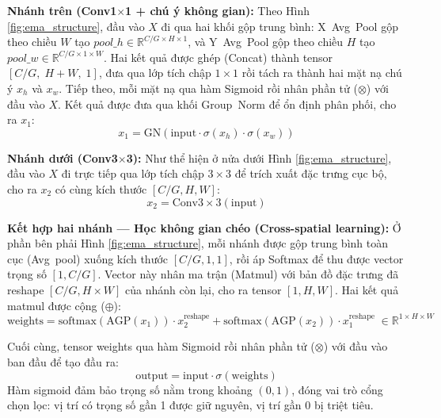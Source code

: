 \documentclass{uetgraduation}
\begin{document}
\textbf{Nhánh trên (Conv1$\times$1 + chú ý không gian):} Theo Hình
\ref{fig:ema_structure}, đầu vào $X$ đi qua hai khối gộp trung bình: X~Avg~Pool
gộp theo chiều $W$ tạo $pool\_h \in \mathbb{R}^{C/G \times H \times 1}$, và
Y~Avg~Pool gộp theo chiều $H$ tạo $pool\_w \in \mathbb{R}^{C/G \times 1 \times W}$.
Hai kết quả được ghép (Concat) thành tensor $[C/G,\; H+W,\; 1]$, đưa qua lớp tích
chập $1\times1$ rồi tách ra thành hai mặt nạ chú ý $x_h$ và $x_w$. Tiếp theo,
mỗi mặt nạ qua hàm Sigmoid rồi nhân phần tử ($\otimes$) với đầu vào $X$. Kết quả
được đưa qua khối Group~Norm để ổn định phân phối, cho ra $x_1$:
\begin{equation}
    x_1 = \text{GN}\!\left(\text{input} \cdot \sigma(x_h) \cdot \sigma(x_w)\right)
    \label{eq:ema_x1}
\end{equation}

\textbf{Nhánh dưới (Conv3$\times$3):} Như thể hiện ở nửa dưới Hình
\ref{fig:ema_structure}, đầu vào $X$ đi trực tiếp qua lớp tích chập $3\times3$ để
trích xuất đặc trưng cục bộ, cho ra $x_2$ có cùng kích thước $[C/G, H, W]$:
\begin{equation}
    x_2 = \text{Conv3}\times\text{3}(\text{input})
    \label{eq:ema_x2}
\end{equation}

\textbf{Kết hợp hai nhánh --- Học không gian chéo (Cross-spatial learning):}
Ở phần bên phải Hình \ref{fig:ema_structure}, mỗi nhánh được gộp trung bình toàn
cục (Avg~pool) xuống kích thước $[C/G, 1, 1]$, rồi áp Softmax để thu được vector
trọng số $[1, C/G]$. Vector này nhân ma trận (Matmul) với bản đồ đặc trưng đã
reshape $[C/G, H \times W]$ của nhánh còn lại, cho ra tensor $[1, H, W]$. Hai kết
quả matmul được cộng ($\oplus$):
\begin{equation}
    \text{weights} = \text{softmax}(\text{AGP}(x_1)) \cdot x_2^{\text{reshape}}
    + \text{softmax}(\text{AGP}(x_2)) \cdot x_1^{\text{reshape}}
    \;\in \mathbb{R}^{1 \times H \times W}
    \label{eq:ema_weights}
\end{equation}

Cuối cùng, tensor weights qua hàm Sigmoid rồi nhân phần tử ($\otimes$) với đầu vào
ban đầu để tạo đầu ra:
\begin{equation}
    \text{output} = \text{input} \cdot \sigma(\text{weights})
    \label{eq:ema_output}
\end{equation}
Hàm sigmoid đảm bảo trọng số nằm trong khoảng $(0, 1)$, đóng vai trò cổng chọn
lọc: vị trí có trọng số gần 1 được giữ nguyên, vị trí gần 0 bị triệt tiêu.
\end{document}
